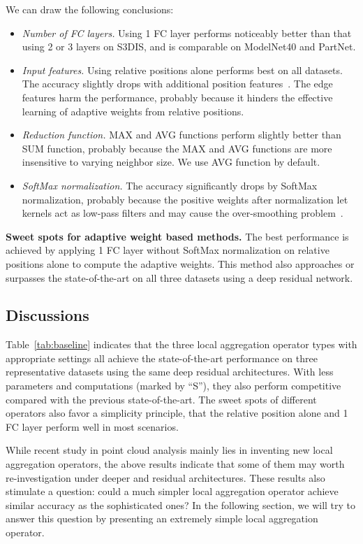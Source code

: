 \documentclass[runningheads]{llncs}
\begin{document}
We can draw the following conclusions:
\begin{itemize}
    \item \emph{Number of FC layers.} Using 1 FC layer performs noticeably better than that using 2 or 3 layers on S3DIS, and is comparable on ModelNet40 and PartNet.
    \item \emph{Input features.} Using relative positions alone performs best on all datasets. The accuracy slightly drops with additional position features~\cite{liu2019rscnn}. The edge features harm the performance, probably because it hinders the effective learning of adaptive weights from relative positions.
    \item \emph{Reduction function.} MAX and AVG functions perform slightly better than SUM function, probably because the MAX and AVG functions are more insensitive to varying neighbor size. We use AVG function by default.
    \item \emph{SoftMax normalization.} The accuracy significantly drops by SoftMax normalization, probably because the positive weights after normalization let kernels act as low-pass filters and may cause the over-smoothing problem~\cite{li2019can}.
\end{itemize}

\vspace{0.3em} \noindent \textbf{Sweet spots for adaptive weight based methods.} The best performance is achieved by applying 1 FC layer without SoftMax normalization on relative positions alone to compute the adaptive weights. This method also approaches or surpasses the state-of-the-art on all three datasets using a deep residual network.

\subsection{Discussions} Table~\ref{tab:baseline} indicates that the three local aggregation operator types with appropriate settings all achieve the state-of-the-art performance on three representative datasets using the same deep residual architectures. With  less parameters and computations (marked by ``S''), they also perform competitive compared with the previous state-of-the-art. The sweet spots of different operators also favor a simplicity principle, that the relative position alone and 1 FC layer perform well in most scenarios.

While recent study in point cloud analysis mainly lies in inventing new local aggregation operators, the above results indicate that some of them may worth re-investigation under deeper and residual architectures. These results also stimulate a question: could a much simpler local aggregation operator achieve similar accuracy as the sophisticated ones? In the following section, we will try to answer this question by presenting an extremely simple local aggregation operator.
\end{document}
